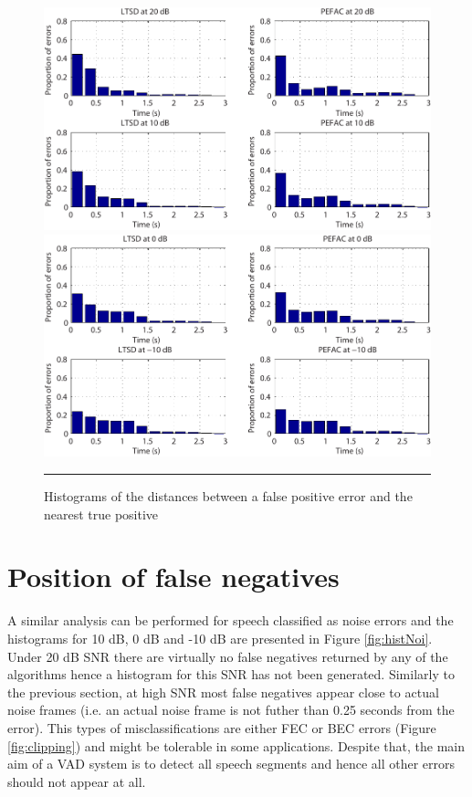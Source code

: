 \begin{figure}[htbp]
	\centering
		\includegraphics[width=1.0\columnwidth]{Figures/Chapter5/histSpch20dB10dB.pdf}
		\includegraphics[width=1.0\columnwidth]{Figures/Chapter5/histSpch0dBm10dB.pdf}
		\rule{37em}{0.5pt}
	\caption[Histograms of the distances between a false positive error and the nearest true positive]{Histograms of the distances between a false positive error and the nearest true positive}
	\label{fig:histSpch}
\end{figure}


\section{Position of false negatives}

A similar analysis can be performed for speech classified as noise errors and the histograms for 10 dB, 0 dB and -10 dB are presented in Figure \ref{fig:histNoi}. Under 20 dB SNR there are virtually no false negatives returned by any of the algorithms hence a histogram for this SNR has not been generated. Similarly to the previous section, at high SNR most false negatives appear close to actual noise frames (i.e. an actual noise frame is not futher than 0.25 seconds from the error). This types of misclassifications are either FEC or BEC errors (Figure \ref{fig:clipping}) and might be tolerable in some applications. Despite that, the main aim of a VAD system is to detect all speech segments and hence all other errors should not appear at all.

